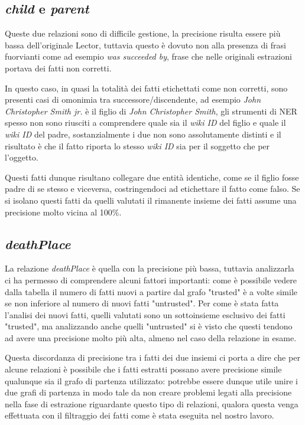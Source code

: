 \documentclass[10pt,a4paper,twocolumn]{article}
\begin{document}
\subsection{\textit{child} e \textit{parent}}\label{child&parent}

Queste due relazioni sono di difficile gestione, la precisione risulta essere più bassa dell'originale Lector, tuttavia questo è dovuto non alla presenza di frasi fuorvianti come ad esempio \textit{was succeeded by}, frase che nelle originali estrazioni portava dei fatti non corretti. 

In questo caso, in quasi la totalità dei fatti etichettati come non corretti, sono presenti casi di omonimia tra successore/discendente, ad esempio \textit{John Christopher Smith jr.} è il figlio di \textit{John Christopher Smith}, gli strumenti di NER spesso non sono riusciti a comprendere quale sia il \textit{wiki ID} del figlio e quale il \textit{wiki ID} del padre, sostanzialmente i due non sono assolutamente distinti e il risultato è che il fatto riporta lo stesso \textit{wiki ID} sia per il soggetto che per l'oggetto.

Questi fatti dunque risultano collegare due entità identiche, come se il figlio fosse padre di se stesso e viceversa, costringendoci ad etichettare il fatto come falso. Se si isolano questi fatti da quelli valutati il rimanente insieme dei fatti assume una precisione molto vicina al 100\%.

\subsection{\textit{deathPlace}} \label{deathPlace}

La relazione \textit{deathPlace} è quella con la precisione più bassa, tuttavia analizzarla ci ha permesso di comprendere alcuni fattori importanti: come è possibile vedere dalla tabella il numero di fatti nuovi a partire dal grafo "trusted" è a volte simile se non inferiore al numero di nuovi fatti "untrusted". Per come è stata fatta l'analisi dei nuovi fatti, quelli valutati sono un sottoinsieme esclusivo dei fatti "trusted", ma analizzando anche quelli "untrusted" si è visto che questi tendono ad avere una precisione molto più alta, almeno nel caso della relazione in esame.

Questa discordanza di precisione tra i fatti dei due insiemi ci porta a dire che per alcune relazioni è possibile che i fatti estratti possano avere precisione simile qualunque sia il grafo di partenza utilizzato: potrebbe essere dunque utile unire i due grafi di partenza in modo tale da non creare problemi legati alla precisione nella fase di estrazione riguardante questo tipo di relazioni, qualora questa venga effettuata con il filtraggio dei fatti come è stata eseguita nel nostro lavoro.
\end{document}
